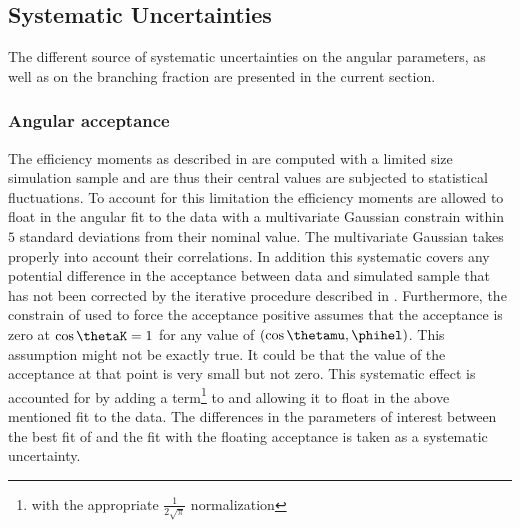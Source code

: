\subsection{Systematic Uncertainties}
\label{systemics}
The different source of systematic uncertainties on the \Bs angular parameters, as well as on the branching fraction
are presented in the current section.

\subsubsection{Angular acceptance}
\label{systAngAcc}
The efficiency moments as described in  are computed with a limited size simulation sample
and are thus their central values are subjected to statistical fluctuations. To account for this limitation the
efficiency moments are allowed to float in the angular fit to the data with a multivariate Gaussian constrain within $5$
standard deviations from their nominal value. The multivariate Gaussian takes properly into account their correlations.
In addition this systematic covers any potential difference in the acceptance between data and simulated sample
that has not been corrected by the iterative procedure described in . Furthermore,
the constrain of  used to force the acceptance positive assumes that the acceptance is zero
at $\cos\thetaK=1$ for any value of $(\cos\thetamu,\phihel)$. This assumption might not be exactly true. It could be
that the value of the acceptance at that point is very small but not zero. This systematic effect is accounted for
by adding a term\footnote{with the appropriate $\frac{1}{2\sqrt{\pi}}$ normalization} to  and allowing it to 
float in the above mentioned fit to the data. The differences in the parameters of interest between the best fit 
of  and the fit with the floating acceptance is taken as a systematic uncertainty. 

